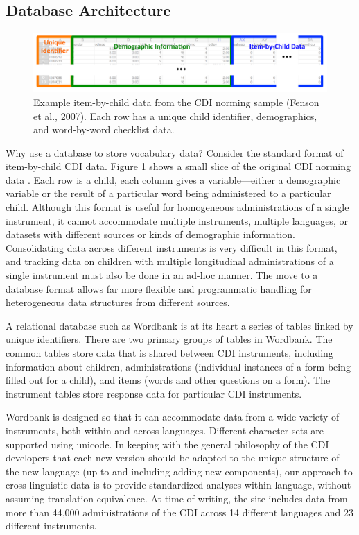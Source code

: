 \documentclass[doc,noapacite]{apa2}
\begin{document}
\subsection{Database Architecture}

\begin{figure}[t]
\centering
\includegraphics[width=5in]{figures/itembychild.pdf}
\caption{\label{fig:data} Example item-by-child data from the CDI norming sample (Fenson et al., 2007). Each row has a unique child identifier, demographics, and word-by-word checklist data. }
\end{figure}

Why use a database to store vocabulary data? Consider the standard format of item-by-child CDI data. Figure \ref{fig:data} shows a small slice of the original CDI norming data \cite{fenson1994,fenson2007}. Each row is a child, each column gives a variable---either a demographic variable or the result of a particular word being administered to a particular child. Although this format is useful for homogeneous administrations of a single instrument, it cannot accommodate multiple instruments, multiple languages, or datasets with different sources or kinds of demographic information. Consolidating data across different instruments is very difficult in this format, and tracking data on children with multiple longitudinal administrations of a single instrument must also be done in an ad-hoc manner. The move to a database format allows far more flexible and programmatic handling for heterogeneous data structures from different sources. 

A relational database such as Wordbank is at its heart a series of tables linked by unique identifiers. There are two primary groups of tables in Wordbank. The common tables store data that is shared between CDI instruments, including information about children, administrations (individual instances of a form being filled out for a child), and items (words and other questions on a form). The instrument tables store response data for particular CDI instruments.

Wordbank is designed so that it can accommodate data from a wide variety of instruments, both within and across languages. Different character sets are supported using unicode.  In keeping with the general philosophy of the CDI developers that each new version should be adapted to the unique structure of the new language (up to and including adding new components), our approach to cross-linguistic data is to provide standardized analyses within language, without assuming translation equivalence. At time of writing, the site includes data from more than 44,000 administrations of the CDI across 14 different languages and 23 different instruments. 
\end{document}
